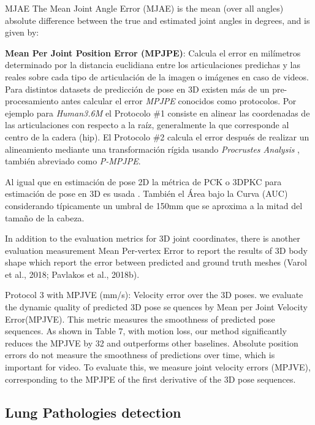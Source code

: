 MJAE
The Mean Joint Angle Error (MJAE) is the mean (over all angles)
absolute difference between the true and estimated joint
angles in degrees, and is given by:

\textbf{Mean Per Joint Position Error (MPJPE)}: Calcula el error en milímetros determinado por la distancia
euclidiana entre los articulaciones predichas y las reales sobre cada tipo de articulación de la
imagen o imágenes en caso de videos. Para distintos datasets de predicción de pose en 3D existen
más de un pre-procesamiento antes calcular el error \textit{MPJPE} conocidos como protocolos.
Por ejemplo para \textit{Human3.6M} el Protocolo \#1 consiste en alinear las coordenadas de las
articulaciones con respecto a la raíz, generalmente la que corresponde al centro de la cadera (hip).
El Protocolo \#2 calcula el error después de realizar un alineamiento mediante una transformación
rígida usando \textit{Procrustes Analysis} \cite{Gower1975}, también abreviado como \textit{P-MPJPE}.

Al igual que en estimación de pose 2D la métrica de PCK o 3DPKC para estimación de pose en 3D es
usada \cite{DBLP:journals/corr/MehtaRCSXT16}. También el Área bajo la Curva (AUC) considerando
típicamente un umbral de 150mm que se aproxima a la mitad del tamaño de la cabeza.

In addition to the evaluation metrics for 3D joint coordinates, there
is another evaluation measurement Mean Per-vertex Error to report
the results of 3D body shape which report the error between predicted
and ground truth meshes (Varol et al., 2018; Pavlakos et al., 2018b).

Protocol 3 with MPJVE (mm/s): Velocity error over the 3D poses.
we evaluate the dynamic quality of predicted 3D pose sequences by Mean per Joint Velocity
Error(MPJVE). This metric measures the
smoothness of predicted pose sequences. As shown in Table 7, with motion loss,
our method significantly reduces the MPJVE by 32%
and outperforms other baselines.
Absolute position errors do not measure the smoothness
of predictions over time, which is important for video. To
evaluate this, we measure joint velocity errors (MPJVE),
corresponding to the MPJPE of the first derivative of the 3D pose sequences. \cite{8954163}




\subsection{Lung Pathologies detection}
